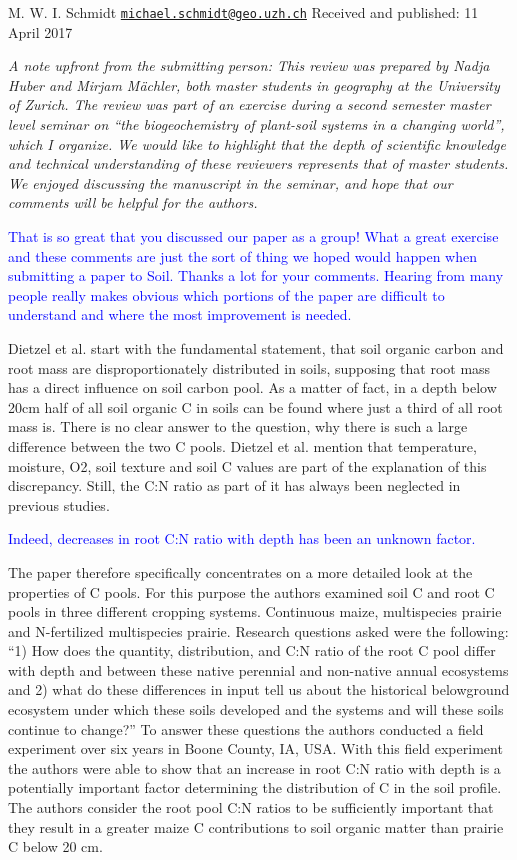 \documentclass[]{article}
\begin{document}
M. W. I. Schmidt
\href{mailto:michael.schmidt@geo.uzh.ch}{\nolinkurl{michael.schmidt@geo.uzh.ch}}
Received and published: 11 April 2017

\emph{A note upfront from the submitting person: This review was
prepared by Nadja Huber and Mirjam Mächler, both master students in
geography at the University of Zurich. The review was part of an
exercise during a second semester master level seminar on ``the
biogeochemistry of plant-soil systems in a changing world'', which I
organize. We would like to highlight that the depth of scientific
knowledge and technical understanding of these reviewers represents that
of master students. We enjoyed discussing the manuscript in the seminar,
and hope that our comments will be helpful for the authors.}

\textcolor{blue}{That is so great that you discussed our paper as a group! What a great exercise and these comments are just the sort of thing we hoped would happen when submitting a paper to Soil. Thanks a lot for your comments. Hearing from many people really makes obvious which portions of the paper are difficult to understand and where the most improvement is needed.}

Dietzel et al. start with the fundamental statement, that soil organic
carbon and root mass are disproportionately distributed in soils,
supposing that root mass has a direct influence on soil carbon pool. As
a matter of fact, in a depth below 20cm half of all soil organic C in
soils can be found where just a third of all root mass is. There is no
clear answer to the question, why there is such a large difference
between the two C pools. Dietzel et al. mention that temperature,
moisture, O2, soil texture and soil C values are part of the explanation
of this discrepancy. Still, the C:N ratio as part of it has always been
neglected in previous studies.

\textcolor{blue}{Indeed, decreases in root C:N ratio with depth has been an unknown factor.}

The paper therefore specifically concentrates on a more detailed look at
the properties of C pools. For this purpose the authors examined soil C
and root C pools in three different cropping systems. Continuous maize,
multispecies prairie and N-fertilized multispecies prairie. Research
questions asked were the following: ``1) How does the quantity,
distribution, and C:N ratio of the root C pool differ with depth and
between these native perennial and non-native annual ecosystems and 2)
what do these differences in input tell us about the historical
belowground ecosystem under which these soils developed and the systems
and will these soils continue to change?'' To answer these questions the
authors conducted a field experiment over six years in Boone County, IA,
USA. With this field experiment the authors were able to show that an
increase in root C:N ratio with depth is a potentially important factor
determining the distribution of C in the soil profile. The authors
consider the root pool C:N ratios to be sufficiently important that they
result in a greater maize C contributions to soil organic matter than
prairie C below 20 cm.
\end{document}
